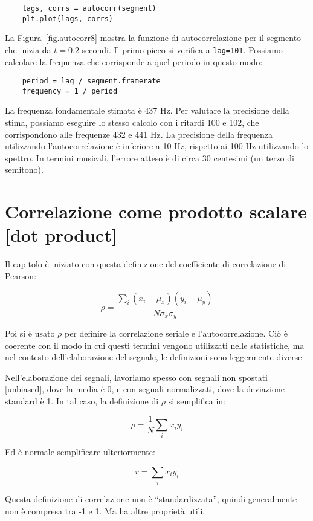 \documentclass[12pt,a4paper]{book}
\begin{document}
\begin{verbatim} 
    lags, corrs = autocorr(segment)
    plt.plot(lags, corrs)
 \end{verbatim} 

La Figura~\ref{fig.autocorr8} mostra la funzione di autocorrelazione per il segmento che inizia da $t=0.2$ secondi. Il primo picco si verifica a {\tt lag=101}. Possiamo calcolare la frequenza che corrisponde a quel periodo in questo modo:

\begin{verbatim} 
    period = lag / segment.framerate
    frequency = 1 / period
 \end{verbatim} 

La frequenza fondamentale stimata è 437 Hz. Per valutare la precisione della stima, possiamo eseguire lo stesso calcolo con i ritardi 100 e 102, che corrispondono alle frequenze 432 e 441 Hz. La precisione della frequenza utilizzando l'autocorrelazione è inferiore a 10 Hz, rispetto ai 100 Hz utilizzando lo spettro. In termini musicali, l'errore atteso è di circa 30 centesimi (un terzo di semitono).

\section{Correlazione come prodotto scalare [dot product]} \label{dotproduct} 

Il capitolo è iniziato con questa definizione del coefficiente di correlazione di Pearson:

%
\[ \rho = \frac{ \sum_i (x_i - \mu_x) (y_i - \mu_y)}{N \sigma_x \sigma_y} \] 

%
Poi si è usato $\rho$ per definire la correlazione seriale e l'autocorrelazione. Ciò è coerente con il modo in cui questi termini vengono utilizzati nelle statistiche, ma nel contesto dell'elaborazione del segnale, le definizioni sono leggermente diverse.

Nell'elaborazione dei segnali, lavoriamo spesso con segnali non spostati [unbiased], dove la media è 0, e con segnali normalizzati, dove la deviazione standard è 1. In tal caso, la definizione di $\rho$ si semplifica in:

%
\[ \rho = \frac{1}{N} \sum_i x_i y_i \] 

%
Ed è normale semplificare ulteriormente:

%
\[ r = \sum_i x_i y_i \] 

%
Questa definizione di correlazione non è ``standardizzata'', quindi generalmente non è compresa tra -1 e 1. Ma ha altre proprietà utili.
\end{document}
